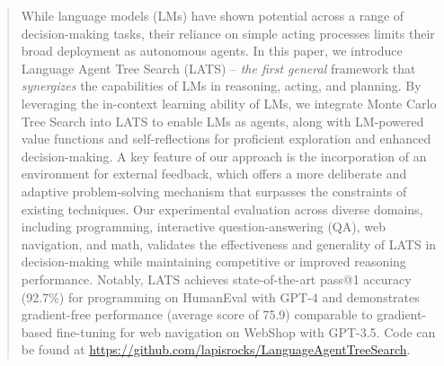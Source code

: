 \documentclass{article}
\theoremstyle{plain}
\theoremstyle{definition}
\theoremstyle{remark}
\begin{document}
\printAffiliationsAndNotice{} %
\begin{abstract}
While language models (LMs) have shown potential across a range of decision-making tasks, their reliance on simple acting processes limits their broad deployment as autonomous agents. In this paper, we introduce Language Agent Tree Search (LATS) -- \emph{the first general} framework that \emph{synergizes} the capabilities of LMs in reasoning, acting, and planning. By leveraging the in-context learning ability of LMs, we integrate Monte Carlo Tree Search into LATS to enable LMs as agents, along with LM-powered value functions and self-reflections for proficient exploration and enhanced decision-making. A key feature of our approach is the incorporation of an environment for external feedback, which offers a more deliberate and adaptive problem-solving mechanism that surpasses the constraints of existing techniques. Our experimental evaluation across diverse domains, including programming, interactive question-answering (QA), web navigation, and math, validates the effectiveness and generality of LATS in decision-making while maintaining competitive or improved reasoning performance. Notably, LATS achieves state-of-the-art pass@1 accuracy (92.7\%) for programming on HumanEval with GPT-4 and demonstrates gradient-free performance (average score of 75.9) comparable to gradient-based fine-tuning for web navigation on WebShop with GPT-3.5. Code can be found at \url{https://github.com/lapisrocks/LanguageAgentTreeSearch}.
\end{abstract}
\end{document}
